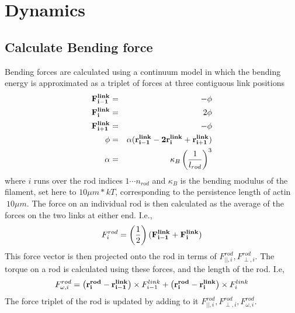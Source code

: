 \documentclass[11pt]{article}
\begin{document}
\section{Dynamics} 
\subsection{Calculate Bending force}
Bending forces are calculated using a continuum model \cite{nedelec} in which the bending energy is approximated as a
triplet of forces at three contiguous link positions
\begin{eqnarray}
  \bf{F}^{link}_{i-1} &=& -\phi\nonumber\\
  \bf{F}^{link}_{i} &=& 2\phi\nonumber\\
  \bf{F}^{link}_{i+1} &=& -\phi\nonumber\\
  \phi &=& \alpha(\bf{r}^{link}_{i-1} - 2\bf{r}^{link}_i + \bf{r}^{link}_{i+1})\nonumber\\
  \alpha &=& \kappa_B\left( 1\over l_{rod} \right)^3
  \label{eqn:flink}
\end{eqnarray}
where $i$ runs over the rod indices $1\cdots n_{rod}$ and $\kappa_B$ is the bending modulus of the filament, set here to
$10\mu m*kT$, corresponding to the persistence length of actin $~10\mu m$. The force on an individual rod is then
calculated as the average of the forces on the two links at either end. I.e.,
\begin{equation} 
  F^{rod}_i = \left( 1\over2 \right)(\bf{F}^{link}_{i-1} + \bf{F}^{link}_{i})
  \label{eqn:frod}
\end{equation}
This force vector is then projected onto the rod in terms of ${F^{rod}_{||,i}, F^{rod}_{\perp,i}}$. 
The torque on a rod is calculated using these forces, and the length of the rod. I.e,
\begin{equation}
  F^{rod}_{\omega,i} = \left(  \bf{r}^{rod}_{i} - \bf{r}^{link}_{i-1}\right)\times F^{link}_{i-1} + 
  \left(  \bf{r}^{rod}_{i} - \bf{r}^{link}_{i}\right)\times F^{link}_{i}
  \label{eqn:trqrod}
\end{equation}
The force triplet of the rod is updated by adding to it ${F^{rod}_{||,i}, F^{rod}_{\perp,i}, F^{rod}_{\omega,i}}$.
\end{document}
